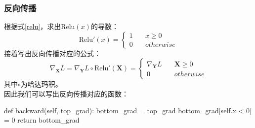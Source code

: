 \documentclass[12pt,a4paper]{ctexart}
\numberwithin{equation}{section}%
\numberwithin{figure}{section}%
\begin{document}
\subsubsection{反向传播}
根据式\eqref{relu}，求出$\mathrm{Relu}(x)$的导数：
\begin{equation}
\mathrm{Relu}'(x)=\left \{ 
    \begin{aligned}
    1 \quad &x \ge 0 \\
    0 \quad &otherwise
    \end{aligned}
    \right .
\end{equation}
接着写出反向传播对应的公式：
\begin{equation}
\nabla_{\boldsymbol{X}} L= \nabla_{\boldsymbol{Y}} L \circ \mathrm{Relu}'(\boldsymbol{X})
=\left \{ 
    \begin{aligned}
    \nabla_{\boldsymbol{Y}} L \quad &\boldsymbol{X} \ge 0 \\
    0 \quad &otherwise
    \end{aligned}
    \right .
\end{equation}
其中$\circ$为哈达玛积。\\
因此我们可以写出反向传播对应的函数：
\begin{python}
def backward(self, top_grad):
    bottom_grad = top_grad
    bottom_grad[self.x < 0] = 0
    return bottom_grad
\end{python}
\end{document}
